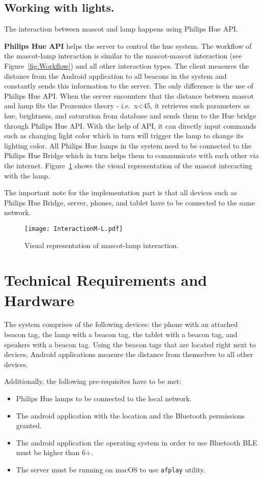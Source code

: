 \subsection{Working with lights.}
\label{subsec:working-with-lights.}
The interaction between mascot and lamp happens using Philips Hue API\@.

\textbf{Philips Hue API} helps the server to control the hue system.
The workflow of the mascot-lamp interaction is similar to the mascot-mascot interaction (see Figure~\ref{fig:Workflow})
and all other interaction types.
The client measures the distance from the Android application to all beacons
in the system and constantly sends this information to the server.
The only difference is the use of Philips Hue API\@.
When the server encounters that the distance between mascot and lamp fits the Proxemics theory - i.e.\ x<45, it
retrieves such parameters as hue, brightness, and saturation from database and sends them
to the Hue bridge through Philips Hue API\@.
With the help of API, it can directly input commands such as changing light color which in turn will trigger the lamp to
change its lighting color.
All Philips Hue lamps in the system need to be connected to the Philips Hue Bridge which in turn helps them
to communicate with each other via the internet.
Figure~\ref{fig:InteractionMl} shows the visual representation of the mascot interacting with the lamp.

The important note for the implementation part is that all devices such as Philips Hue Bridge, server,
phones, and tablet have to be connected to the same network.
\begin{figure}[hbt!]
    \centering
    \texttt{[image: InteractionM-L.pdf]}
    \caption{Visual representation of mascot-lamp interaction.}
    \label{fig:InteractionMl}
\end{figure}

\section{Technical Requirements and Hardware}
\label{sec:technical-requirements-and-hardware}
The system comprises of the following devices: the phone with an attached beacon tag,
the lamp with a beacon tag, the tablet with a beacon tag, and speakers with a beacon tag.
Using the beacon tags that are located right next to devices, Android applications
measure the distance from themselves to all other devices.

Additionally, the following pre-requisites have to be met:
\begin{itemize}
    \item Philips Hue lamps to be connected to the local network.
    \item The android application with the location and the Bluetooth permissions granted.
    \item The android application the operating system in order to use Bluetooth BLE must be higher than 6+.
    \item The server must be running on macOS to use \texttt{afplay} utility.
\end{itemize}

